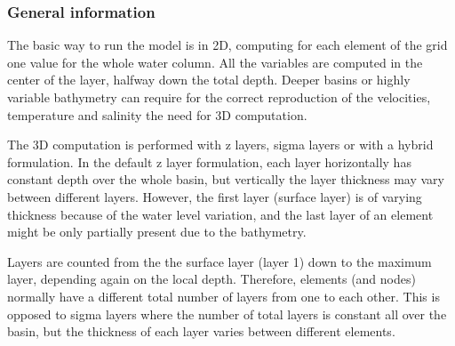 
%
%
%
%
%
%
%

\subsubsection{General information}

The basic way to run the model is in 2D, computing for each element of the
grid one value for the whole water column.  All the variables are computed
in the center of the layer, halfway down the total depth.  Deeper basins
or highly variable bathymetry can require for the correct reproduction
of the velocities, temperature and salinity the need for 3D computation.

The 3D computation is performed with z layers, sigma layers or with
a hybrid formulation.  In the default z layer formulation, each layer
horizontally has constant depth over the whole basin, but vertically
the layer thickness may vary between different layers. However, the
first layer (surface layer) is of varying thickness because of the water
level variation, and the last layer of an element might be only partially
present due to the bathymetry.

Layers are counted from the the surface layer (layer 1) down to the
maximum layer, depending again on the local depth. Therefore, elements
(and nodes) normally have a different total number of layers from one to
each other. This is opposed to sigma layers where the number of total
layers is constant all over the basin, but the thickness of each layer
varies between different elements.

